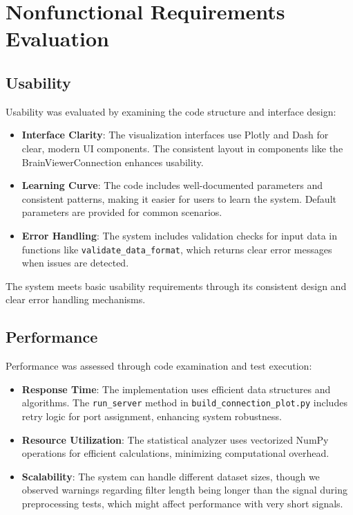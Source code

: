 \documentclass[12pt, titlepage]{article}
\begin{document}
\section{Nonfunctional Requirements Evaluation}

\subsection{Usability}
Usability was evaluated by examining the code structure and interface design:

\begin{itemize}
    \item \textbf{Interface Clarity}: The visualization interfaces use Plotly and Dash for clear, modern UI components. The consistent layout in components like the BrainViewerConnection enhances usability.
    
    \item \textbf{Learning Curve}: The code includes well-documented parameters and consistent patterns, making it easier for users to learn the system. Default parameters are provided for common scenarios.
    
    \item \textbf{Error Handling}: The system includes validation checks for input data in functions like \texttt{validate\_data\_format}, which returns clear error messages when issues are detected.
\end{itemize}

The system meets basic usability requirements through its consistent design and clear error handling mechanisms.

\subsection{Performance}
Performance was assessed through code examination and test execution:

\begin{itemize}
    \item \textbf{Response Time}: The implementation uses efficient data structures and algorithms. The \texttt{run\_server} method in \texttt{build\_connection\_plot.py} includes retry logic for port assignment, enhancing system robustness.
    
    \item \textbf{Resource Utilization}: The statistical analyzer uses vectorized NumPy operations for efficient calculations, minimizing computational overhead.
    
    \item \textbf{Scalability}: The system can handle different dataset sizes, though we observed warnings regarding filter length being longer than the signal during preprocessing tests, which might affect performance with very short signals.
\end{itemize}
\end{document}
